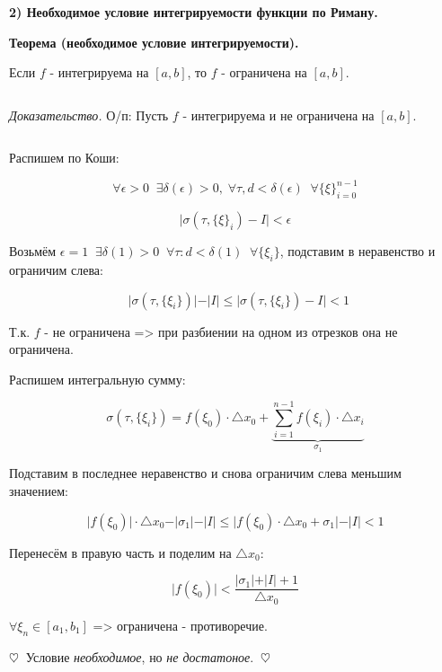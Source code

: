 \documentclass[a4paper,14pt]{article}
\begin{document}
    \begin{center}
        \textbf{2) Необходимое условие интегрируемости функции по Риману.}
    \end{center}

    \textbf{Теорема (необходимое условие интегрируемости).}
    
    Если $f$ - интегрируема на $[a, b]$, то $f$ - ограничена на $[a, b]$.

    $\;$

    \textit{Доказательство.} О/п: Пусть $f$ - интегрируема и не ограничена на $[a, b]$.

    $\;$

    \begin{center}
        {Распишем по Коши:}
    \end{center}

    $$\forall\epsilon>0\;\;\exists\delta(\epsilon)>0,\;\forall\tau,d<\delta(\epsilon)\;\;\forall\lbrace\xi\rbrace_{i=0}^{n-1}$$

    $$\vert\sigma(\tau,\lbrace\xi\rbrace_i)-I\vert<\epsilon$$

    \begin{center}
        {Возьмём $\epsilon=1\;\;\exists\delta(1)>0\;\;\forall\tau:d<\delta(1)\;\;\forall\lbrace\xi_i\rbrace$, подставим в неравенство и ограничим слева:}
    \end{center}

    $$\;\;\vert\sigma(\tau,\lbrace\xi_i\rbrace)\vert-\vert{I}\vert\leq\vert\sigma(\tau,\lbrace\xi_i\rbrace)-I\vert<1 \label{eq:1}$$

    \begin{center}
        {Т.к. $f$ - не ограничена => при разбиении на одном из отрезков она не ограничена.}
    \end{center}

    \begin{center}
        {Распишем интегральную сумму:}
    \end{center}

    $$\sigma(\tau,\lbrace{\xi_i}\rbrace)=f(\xi_0)\cdot\triangle{x_0}+\underbrace{\overset{n-1}{\underset{i=1}{\sum}}f(\xi_i)\cdot\triangle{x_i}}_{\sigma_1}$$

    \begin{center}
        {Подставим в последнее неравенство и снова ограничим слева меньшим значением:}
    \end{center}

    $$\vert{f(\xi_0)}\vert\cdot\triangle{x_0}-\vert{\sigma_1}\vert-\vert{I}\vert\leq\vert{f(\xi_0)\cdot\triangle{x_0}+\sigma_1}\vert-\vert{I}\vert<1$$

    \begin{center}
        {Перенесём в правую часть и поделим на $\triangle{x_0}$:}
    \end{center}
    
    $$\vert{f(\xi_0)}\vert<\frac{\vert\sigma_1\vert+\vert{I}\vert+1}{\triangle{x_0}}$$

    $\forall\xi_n\in[a_1, b_1]$ => ограничена - противоречие.

    \begin{center}
        {$\heartsuit\;\;$Условие \textit{необходимое}, но \textit{не достатоное}.$\;\;\heartsuit$}
    \end{center}
\end{document}
